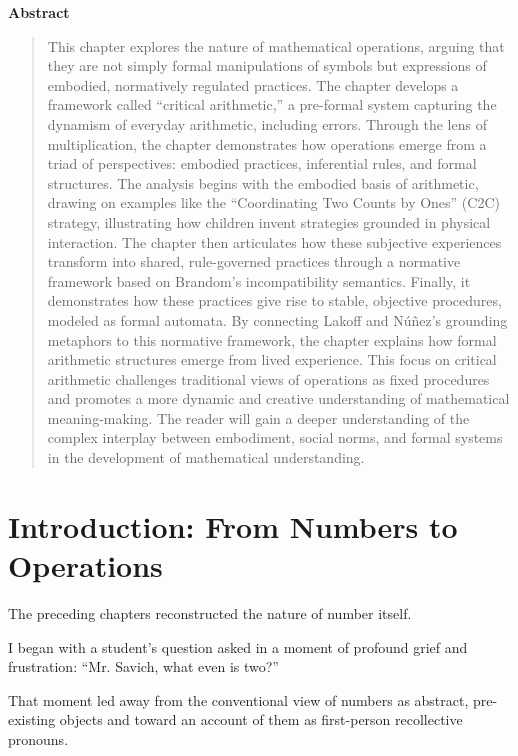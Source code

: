 \documentclass[12pt]{book}
\newenvironment{abstract}
    { %
      \begin{center} %
        \textbf{Abstract} %
      \end{center}
      \vspace{\baselineskip} %
      \begin{quotation} %
      \small %
    }
    { %
      \end{quotation} %
      \bigskip %
    }
\begin{document}
\begin{abstract}
This chapter explores the nature of mathematical operations, arguing
that they are not simply formal manipulations of symbols but expressions
of embodied, normatively regulated practices. The chapter develops a
framework called ``critical arithmetic,'' a pre-formal system capturing
the dynamism of everyday arithmetic, including errors. Through the lens
of multiplication, the chapter demonstrates how operations emerge from a
triad of perspectives: embodied practices, inferential rules, and formal
structures. The analysis begins with the embodied basis of arithmetic,
drawing on examples like the ``Coordinating Two Counts by Ones'' (C2C)
strategy, illustrating how children invent strategies grounded in
physical interaction. The chapter then articulates how these subjective
experiences transform into shared, rule-governed practices through a
normative framework based on Brandom's incompatibility semantics.
Finally, it demonstrates how these practices give rise to stable,
objective procedures, modeled as formal automata. By connecting Lakoff
and Núñez's grounding metaphors to this normative framework, the chapter
explains how formal arithmetic structures emerge from lived experience.
This focus on critical arithmetic challenges traditional views of
operations as fixed procedures and promotes a more dynamic and creative
understanding of mathematical meaning-making. The reader will gain a
deeper understanding of the complex interplay between embodiment, social
norms, and formal systems in the development of mathematical
understanding.

\end{abstract}

\section{Introduction: From Numbers to Operations}

The preceding chapters reconstructed the nature of number itself.

I began with a student's question asked in a moment of profound grief and frustration: ``Mr. Savich, what even is two?''

That moment led away from the conventional view of numbers as abstract, pre-existing objects and toward an account of them as first-person recollective pronouns.
\end{document}
